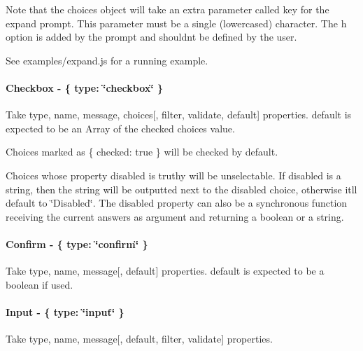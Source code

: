 Note that the {\ttfamily choices} object will take an extra parameter called {\ttfamily key} for the {\ttfamily expand} prompt. This parameter must be a single (lowercased) character. The {\ttfamily h} option is added by the prompt and shouldn\textquotesingle{}t be defined by the user.

See {\ttfamily examples/expand.\+js} for a running example.

  



\paragraph*{Checkbox -\/ {\ttfamily \{ type\+: \char`\"{}checkbox\char`\"{} \}}}

Take {\ttfamily type}, {\ttfamily name}, {\ttfamily message}, {\ttfamily choices}\mbox{[}, {\ttfamily filter}, {\ttfamily validate}, {\ttfamily default}\mbox{]} properties. {\ttfamily default} is expected to be an Array of the checked choices value.

Choices marked as {\ttfamily \{ checked\+: true \}} will be checked by default.

Choices whose property {\ttfamily disabled} is truthy will be unselectable. If {\ttfamily disabled} is a string, then the string will be outputted next to the disabled choice, otherwise it\textquotesingle{}ll default to {\ttfamily \char`\"{}\+Disabled\char`\"{}}. The {\ttfamily disabled} property can also be a synchronous function receiving the current answers as argument and returning a boolean or a string.

 



\paragraph*{Confirm -\/ {\ttfamily \{ type\+: \char`\"{}confirm\char`\"{} \}}}

Take {\ttfamily type}, {\ttfamily name}, {\ttfamily message}\mbox{[}, {\ttfamily default}\mbox{]} properties. {\ttfamily default} is expected to be a boolean if used.

 



\paragraph*{Input -\/ {\ttfamily \{ type\+: \char`\"{}input\char`\"{} \}}}

Take {\ttfamily type}, {\ttfamily name}, {\ttfamily message}\mbox{[}, {\ttfamily default}, {\ttfamily filter}, {\ttfamily validate}\mbox{]} properties.

